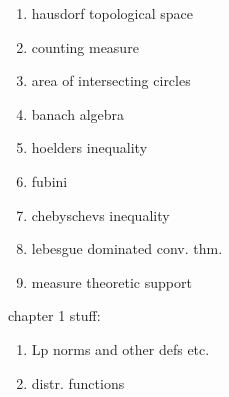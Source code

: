 \begin{enumerate}
\item hausdorf topological space
\item counting measure
\item area of intersecting circles
\item banach algebra
\item hoelders inequality
\item fubini
\item chebyschevs inequality
\item lebesgue dominated conv. thm.
\item measure theoretic support
\end{enumerate}

chapter 1 stuff:
\begin{enumerate}
\item Lp norms and other defs etc.
\item distr. functions
\end{enumerate}


